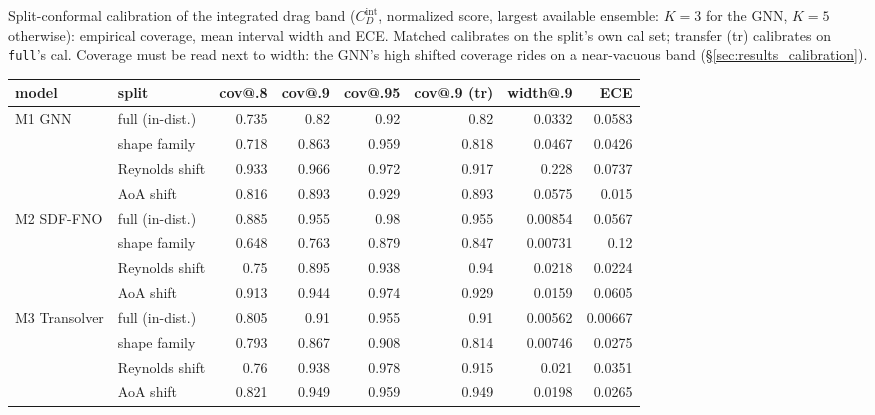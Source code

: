 \caption{Split-conformal calibration of the integrated drag band ($C_D^{\mathrm{int}}$, normalized score, largest available ensemble: $K{=}3$ for the GNN, $K{=}5$ otherwise): empirical coverage, mean interval width and ECE. Matched calibrates on the split's own cal set; transfer (tr) calibrates on \texttt{full}'s cal. Coverage must be read next to width: the GNN's high shifted coverage rides on a near-vacuous band (\S\ref{sec:results_calibration}).}
\label{tab:calibration}
\providecommand{\tblfont}{\footnotesize}%
\tblfont
\setlength{\tabcolsep}{4pt}
\begin{tabular}{llrrrrrr}
\toprule
model & split & cov@.8 & cov@.9 & cov@.95 & cov@.9 (tr) & width@.9 & ECE \\
\midrule
M1 GNN & full (in-dist.) & 0.735 & 0.82 & 0.92 & 0.82 & 0.0332 & 0.0583 \\
 & shape family & 0.718 & 0.863 & 0.959 & 0.818 & 0.0467 & 0.0426 \\
 & Reynolds shift & 0.933 & 0.966 & 0.972 & 0.917 & 0.228 & 0.0737 \\
 & AoA shift & 0.816 & 0.893 & 0.929 & 0.893 & 0.0575 & 0.015 \\
\addlinespace
M2 SDF-FNO & full (in-dist.) & 0.885 & 0.955 & 0.98 & 0.955 & 0.00854 & 0.0567 \\
 & shape family & 0.648 & 0.763 & 0.879 & 0.847 & 0.00731 & 0.12 \\
 & Reynolds shift & 0.75 & 0.895 & 0.938 & 0.94 & 0.0218 & 0.0224 \\
 & AoA shift & 0.913 & 0.944 & 0.974 & 0.929 & 0.0159 & 0.0605 \\
\addlinespace
M3 Transolver & full (in-dist.) & 0.805 & 0.91 & 0.955 & 0.91 & 0.00562 & 0.00667 \\
 & shape family & 0.793 & 0.867 & 0.908 & 0.814 & 0.00746 & 0.0275 \\
 & Reynolds shift & 0.76 & 0.938 & 0.978 & 0.915 & 0.021 & 0.0351 \\
 & AoA shift & 0.821 & 0.949 & 0.959 & 0.949 & 0.0198 & 0.0265 \\
\bottomrule
\end{tabular}
